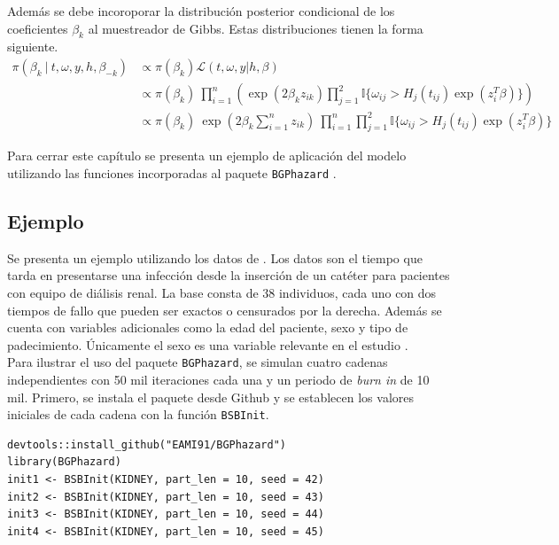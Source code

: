 \documentclass[11pt,a4paper]{article}
\begin{document}
Además se debe incoroporar la distribución posterior condicional de los coeficientes $\beta_k$ al muestreador de Gibbs. Estas distribuciones tienen la forma siguiente.
\begin{align*}
\pi(\beta_k \ | \ t, \omega, y, h, \beta_{-k}) &\propto \pi(\beta_k) \mathcal{L}(t, \omega, y | h, \beta)\\
&\propto \pi(\beta_k) \ \prod_{i=1}^n \left( \exp (2\beta_k z_{ik}) \prod_{j=1}^2 \mathbb{I}\lbrace \omega_{ij} > H_j(t_{ij})\exp (z_i^T\beta) \rbrace \right)\\
&\propto \pi(\beta_k) \ \exp\left( 2\beta_k \sum_{i=1}^n z_{ik}\right) \ \prod_{i=1}^n\prod_{j=1}^2 \mathbb{I}\lbrace \omega_{ij} > H_j(t_{ij})\exp (z_i^T\beta) \rbrace
\end{align*}

Para cerrar este capítulo se presenta un ejemplo de aplicación del modelo utilizando las funciones incorporadas al paquete \texttt{BGPhazard} \citep{bgphazard}.

\subsection{Ejemplo}
\label{sec:ejemplo}
Se presenta un ejemplo utilizando los datos de \citet{kidney}. Los datos son el tiempo que tarda en presentarse una infección desde la inserción de un catéter para pacientes con equipo de diálisis renal. La base consta de 38 individuos, cada uno con dos tiempos de fallo que pueden ser exactos o censurados por la derecha. Además se cuenta con variables adicionales como la edad del paciente, sexo y tipo de padecimiento. Únicamente el sexo es una variable relevante en el estudio \citep{nieto}.\\

Para ilustrar el uso del paquete \texttt{BGPhazard}, se simulan cuatro cadenas independientes con 50 mil iteraciones cada una y un periodo de \textit{burn in} de 10 mil. Primero, se instala el paquete desde Github y se establecen los valores iniciales de cada cadena con la función \texttt{BSBInit}.\\

\begin{lstlisting}
devtools::install_github("EAMI91/BGPhazard")
library(BGPhazard)
init1 <- BSBInit(KIDNEY, part_len = 10, seed = 42)
init2 <- BSBInit(KIDNEY, part_len = 10, seed = 43)
init3 <- BSBInit(KIDNEY, part_len = 10, seed = 44)
init4 <- BSBInit(KIDNEY, part_len = 10, seed = 45)
\end{lstlisting} \leavevmode\newline
\end{document}
